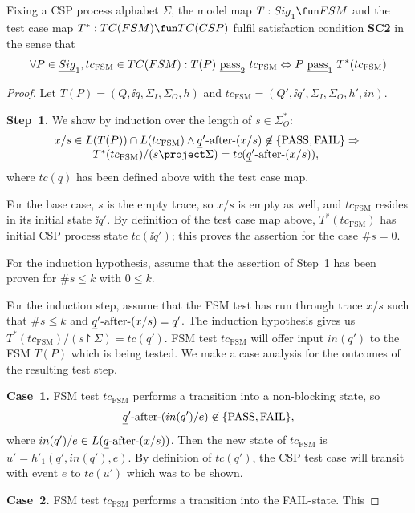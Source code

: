 \begin{theorem}
Fixing a CSP process alphabet $\Sigma$, the model map 
$T : \underline{Sig}_1 \fun FSM$ and the test case map $T^*:TC(FSM) \fun TC(CSP)$ fulfil satisfaction condition {\bf SC2} in the sense that
$$
\forall P\in \underline{Sig}_1, tc_\text{FSM}\in TC(FSM): T(P)\ \underline{\text{pass}}_2\ tc_\text{FSM} \Leftrightarrow
P\ \underline{\text{pass}}_1\ T^*(tc_\text{FSM})
$$
\end{theorem}
\begin{proof}
Let $T(P) = (Q,\ii q,\Sigma_I,\Sigma_O,h)$ and 
$tc_\text{FSM} = (Q',\ii q',\Sigma_I,\Sigma_O,h',in)$.

\noindent
{\bf Step~1.} We show by induction over the length of $s\in\Sigma_O^*$:
$$
\begin{array}{l}
x/s\in L(T(P))\cap L(tc_\text{FSM}) \wedge  \ii q'\after (x/s) \not\in \{\text{PASS},\text{FAIL}\}
\Rightarrow {}
\\\tabd
T^*(tc_\text{FSM})/(s\project \Sigma) = tc(\ii q'\after (x/s)),
\end{array}
$$
where $tc(q)$ has been defined above with the test case map.

For the base case, $s$ is the empty trace, so $x/s$ is empty as well, and $tc_\text{FSM}$ resides in its initial state $\ii q'$. By definition of the test case map above, $T^*(tc_\text{FSM})$ has initial CSP process state $tc(\ii q')$; this proves the assertion for the case $\#s = 0$.

For the induction hypothesis, assume that the assertion of Step~1 has been proven for
$\#s \le k$ with $0\le k$.

For the induction step, assume that the FSM test has run through trace $x/s$ such that
$\#s \le k$ and $\underline{q}'\text{-after-} (x/s) = q'$. The induction hypothesis gives us
$T^*(tc_\text{FSM})/(s\project \Sigma) = tc(q')$.
FSM test $tc_\text{FSM}$ will offer input $in(q')$ to the FSM $T(P)$ which is being tested. We make a case analysis for the outcomes of the resulting test step.


\noindent
{\bf Case~1.} FSM test $tc_\text{FSM}$ 
performs a transition into a non-blocking state, so 
$$
\underline{q}'\text{-after-}(in(q')/e) \not\in\{ \text{PASS},\text{FAIL} \},
$$
where $in(q')/e \in L(\underline{q}\text{-after-}(x/s))$. Then the new state of $tc_\text{FSM}$
is $u' = h'_1(q',in(q'),e)$. By definition of $tc(q')$, the CSP test case will 
transit with event $e$ to $tc(u')$ which was to be shown.

\noindent
{\bf Case~2.} FSM test $tc_\text{FSM}$ 
performs a transition into the FAIL-state. This
\xbox
\end{proof}



